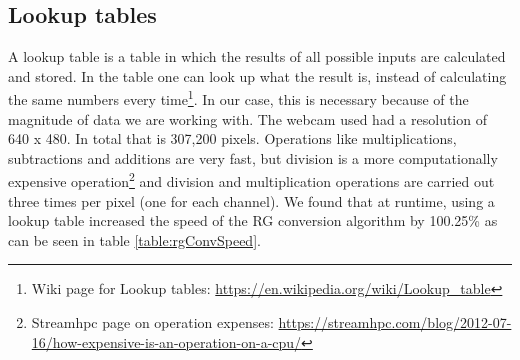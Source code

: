 \subsection{Lookup tables}
A lookup table is a table in which the results of all possible inputs are calculated and stored. In the table one can look up what the result is, instead of calculating the same numbers every time\footnote{Wiki page for Lookup tables: \url{https://en.wikipedia.org/wiki/Lookup_table}}. In our case, this is necessary because of the magnitude of data we are working with. The webcam used had a resolution of 640 x 480. In total that is 307,200 pixels. Operations like multiplications, subtractions and additions are very fast, but division is a more computationally expensive operation\footnote{Streamhpc page on operation expenses: \url{https://streamhpc.com/blog/2012-07-16/how-expensive-is-an-operation-on-a-cpu/}} and division and multiplication operations are carried out three times per pixel (one for each channel). We found that at runtime, using a lookup table increased the speed of the RG conversion algorithm by 100.25\% as can be seen in table \ref{table:rgConvSpeed}.\\
